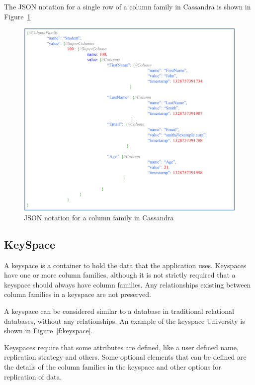 The JSON notation for a single row of a column family in Cassandra is
shown in Figure~\ref{f:columnfamilyJSON} 

\begin{figure}[h]
	\centering
	\includegraphics[width=\textwidth]{./figure/Example/JSON_ColumnFamily_1row.png}
	\caption{JSON notation for a column family in
	Cassandra}\label{f:columnfamilyJSON}
\end{figure} 

\subsection{KeySpace}
 A keyspace is a container to hold the data that the
application uses.  Keyspaces have one or more column families,   although it is not strictly
required that a keyspace should always have column families.  Any relationships
existing between column families in a keyspace are not preserved. 

A keyspace can be considered similar to a database in traditional relational
databases,   without any relationships.  An example of the keyspace
University is shown in Figure~\ref{f:keyspace}. 

Keyspaces require that some attributes are defined,   like a user defined name,  
replication strategy and others.  Some optional elements that can be defined are
the details of the column families in the keyspace and other options
for replication of data. 
 

